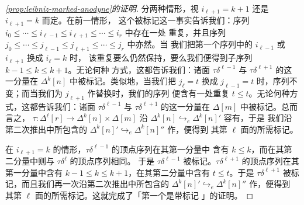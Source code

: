 \begin{proof}[\cref{prop:leibniz-marked-anodyne}的证明]
分两种情形，视 $i_{\ell+1}=k+1$ 还是 $i_{\ell+1}=k$ 而定。在前一情形，
这个\trSimplex{}被标记这一事实告诉我们：序列
$i_{0}\le\cdots\le i_{\ell-1}\le i_{\ell+1}\le\cdots\le i_{r}$ 中存在一处
重复，并且序列
$j_{0}\le\cdots\le j_{\ell-1}\le j_{\ell+1}\le\cdots\le j_{r}$ 中亦然。当
我们把第一个序列中的 $i_{\ell-1}$ 或 $i_{\ell+1}$ 换成 $i_{\ell}=k$ 时，
该重复要么仍然保持，要么我们便得到子序列 $k-1\le k\le k+1$。无论何种
方式，这都告诉我们：诸面 $\tau\delta^{\ell-1}$ 与 $\tau\delta^{\ell+1}$
的这一分量在 $\Delta^{k}[n]$ 中被标记。类似地，当我们把 $j_{\ell}=t$ 换成
$j_{\ell-1}=t$ 时，序列不变；而当我们为 $j_{\ell+1}$ 作替换时，我们的序列
便含有一处重复 $t\le t$。无论何种方式，这都告诉我们：诸面
$\tau\delta^{\ell-1}$ 与 $\tau\delta^{\ell+1}$ 的这一分量在 $\Delta[m]$
中被标记。总而言之，\trSimplex{}
$\tau\colon\Delta^{\ell}[r]\to\Delta^{k}[n]\times\Delta[m]$ 沿
$\Delta^{k}[n]\hookrightarrow_{e}\Delta^{k}[n]'$ 容有\trExtension，于是
我们沿第二次推出中所包含的\trEntireInclusion
$\Delta^{k}[n]'\hookrightarrow_{e}\Delta^{k}[n]''$ 作\trExtension，便得到
其第 $\ell$ 面的所需标记。

在 $i_{\ell+1}=k$ 的情形，$\tau\delta^{\ell-1}$ 的顶点序列在其第一分量中
含有 $k\le k$，而在其第二分量中则与 $\tau\delta^{\ell}$ 的顶点序列相同。
于是 $\tau\delta^{\ell-1}$ 被标记。$\tau\delta^{\ell+1}$ 的顶点序列在其
第一分量中含有 $k-1\le k\le k+1$，在其第二分量中含有 $t\le t$。于是
$\tau\delta^{\ell+1}$ 被标记，而且我们再一次沿第二次推出中所包含的\trEntireInclusion
$\Delta^{k}[n]'\hookrightarrow_{e}\Delta^{k}[n]''$ 作\trExtension，便得到
其第 $\ell$ 面的所需标记。这就完成了「第一个\trLeibnizProduct{}是带标记%
\trAnodyneExtension」的证明。


\end{proof}
